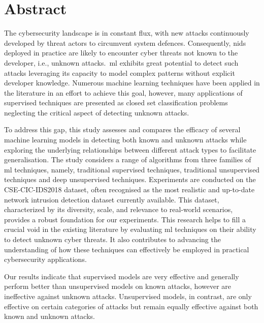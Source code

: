 \chapter*{Abstract}

The cybersecurity landscape is in constant flux, with new attacks continuously
developed by threat actors to circumvent system defences. Consequently,
\gls{nids} deployed in practice are likely to encounter cyber threats not known
to the developer, i.e., unknown attacks.\ \gls{ml} exhibits great potential to
detect such attacks leveraging its capacity to model complex patterns without
explicit developer knowledge. Numerous machine learning techniques have been
applied in the literature in an effort to achieve this goal, however, many
applications of supervised techniques are presented as closed set
classification problems neglecting the critical aspect of detecting unknown
attacks.

To address this gap, this study assesses and compares the efficacy of several
machine learning models in detecting both known and unknown attacks while
exploring the underlying relationships between different attack types to
facilitate generalisation. The study considers a range of algorithms from three
families of \gls{ml} techniques, namely, traditional supervised techniques,
traditional unsupervised techniques and deep unsupervised techniques.
Experiments are conducted on the CSE-CIC-IDS2018 dataset, often recognised as
the most realistic and up-to-date network intrusion detection dataset currently
available. This dataset, characterized by its diversity, scale, and relevance
to real-world scenarios, provides a robust foundation for our experiments. This
research helps to fill a crucial void in the existing literature by evaluating
\gls{ml} techniques on their ability to detect unknown cyber threats. It also
contributes to advancing the understanding of how these techniques can
effectively be employed in practical cybersecurity applications.

Our results indicate that supervised models are very effective and generally
perform better than unsupervised models on known attacks, however are
ineffective against unknown attacks. Unsupervised models, in contrast, are only
effective on certain categories of attacks but remain equally effective against
both known and unknown attacks.
